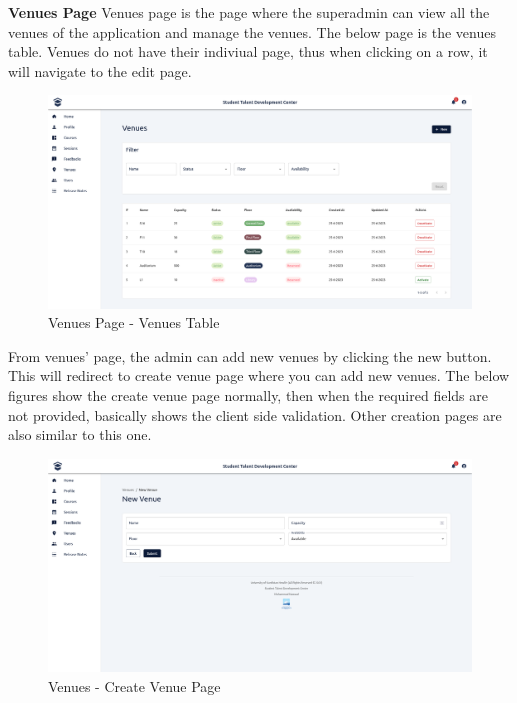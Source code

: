 \begin{justify}
    \clearpage
    \noindent \textbf{Venues Page}\newendline
    Venues page is the page where the superadmin can view all the venues of the application and manage the venues. The below page is the venues table. Venues do not have their indiviual page, thus when clicking on a row, it will navigate to the edit page.

    \begin{figure}[H]
        \centerline{\includegraphics[width=150mm,scale=1]{figures/implementation_and_testing/implementation/frontend/pages/Venues - Table.png}}
        \caption{Venues Page - Venues Table}
    \end{figure}

    \vspace{0.25cm}
    \newendline From venues' page, the admin can add new venues by clicking the new button. This will redirect to create venue page where you can add new venues. The below figures show the create venue page normally, then when the required fields are not provided, basically shows the client side validation. Other creation pages are also similar to this one.

    \begin{figure}[H]
        \centerline{\includegraphics[width=150mm,scale=1]{figures/implementation_and_testing/implementation/frontend/pages/Venues - Create.png}}
        \caption{Venues - Create Venue Page}
    \end{figure}


\end{justify}

